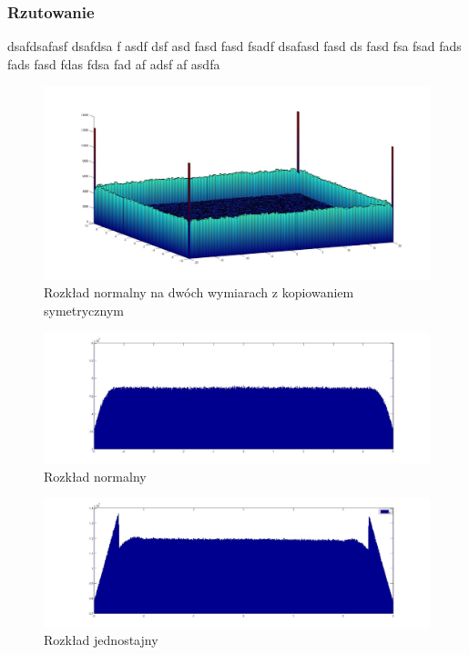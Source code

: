 \documentclass{mini}
\begin{document}
\subsubsection*{Rzutowanie}
dsafdsafasf dsafdsa f asdf dsf asd fasd fasd fsadf dsafasd fasd ds fasd fsa fsad fads fads fasd fdas fdsa fad af adsf af asdfa

\begin{figure}[H]
\centering
\includegraphics[width=\textwidth]{p_n_10M_2__20_20__10_10_4_2}
\caption{Rozkład normalny na dwóch wymiarach z kopiowaniem symetrycznym}
\end{figure}

\begin{figure}[H]
\centering
\includegraphics[width=\textwidth]{p_n_50M_1__5_5}
\caption{Rozkład normalny}
\end{figure}

\begin{figure}[H]
\centering
\includegraphics[width=\textwidth]{p_j_100M_1__3_3}
\caption{Rozkład jednostajny}
\end{figure}
\end{document}
